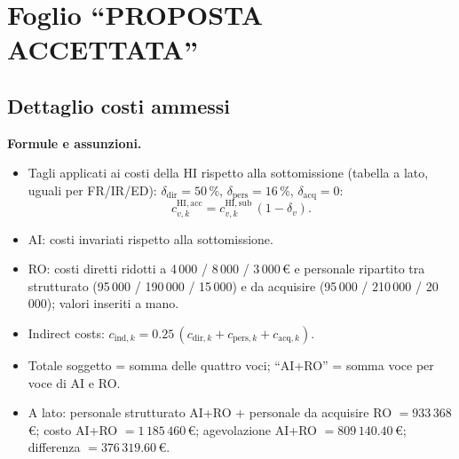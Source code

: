 \documentclass{plan4ari_report}
\begin{document}
\section{Foglio ``PROPOSTA ACCETTATA''}
\subsection{Dettaglio costi ammessi}
\textbf{Formule e assunzioni.}
\begin{itemize}
  \item Tagli applicati ai costi della HI rispetto alla sottomissione (tabella a lato, uguali per FR/IR/ED): $\delta_{\mathrm{dir}} = 50\,\%$, $\delta_{\mathrm{pers}} = 16\,\%$, $\delta_{\mathrm{acq}} = 0$:
  \[ c^{\mathrm{HI,acc}}_{v,k} = c^{\mathrm{HI,sub}}_{v,k}\,(1-\delta_v). \]
  \item AI: costi invariati rispetto alla sottomissione.
  \item RO: costi diretti ridotti a 4\,000 / 8\,000 / 3\,000\,\euro{} e personale ripartito tra strutturato (95\,000 / 190\,000 / 15\,000) e da acquisire (95\,000 / 210\,000 / 20\,000); valori inseriti a mano.
  \item Indirect costs: $c_{\mathrm{ind},k} = 0.25\,(c_{\mathrm{dir},k} + c_{\mathrm{pers},k} + c_{\mathrm{acq},k})$.
  \item Totale soggetto = somma delle quattro voci; ``AI+RO'' = somma voce per voce di AI e RO.
  \item A lato: personale strutturato AI+RO + personale da acquisire RO $= 933\,368$\,\euro; costo AI+RO $= 1\,185\,460$\,\euro; agevolazione AI+RO $= 809\,140.40$\,\euro; differenza $= 376\,319.60$\,\euro.
\end{itemize}
\end{document}
